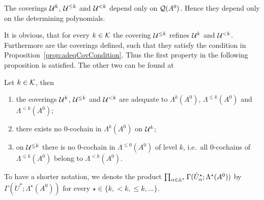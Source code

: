 \begin{rem}
  The coverings $\mathcal{U}^{k}$, $\mathcal{U}^{\leq k}$ and $\mathcal{U}^{<k}$ depend only on
  $\mathcal{Q}(A^0)$. Hence they depend only on the determining polynomials.
\end{rem}
It is obvious, that for every $k\in\mathcal{K}$ the covering $\mathcal{U}^{\leq k}$ refines
$\mathcal{U}^{k}$ and $\mathcal{U}^{<k}$.
Furthermore are the coverings defined, such that they satisfy the
condition in Proposition~\ref{prop:adeqCovCondition}.
Thus the first property in the following proposition is satisfied. The other
two can be found at \cite[Prop.II.3.1 (iv)]{Loday1994}
\begin{prop}\label{prop:adequateProperties}
  Let $k\in\mathcal{K}$, then
  \begin{enumerate}
    \item the coverings $\mathcal{U}^{k}$, $\mathcal{U}^{\leq k}$ and $\mathcal{U}^{<k}$ are adequate
      to $\Lambda^k(A^0)$, $\Lambda^{\leq k}(A^0)$ and $\Lambda^{<k}(A^0)$;
    \item there exists no $0$-cochain in $\Lambda^k(A^0)$ on $\mathcal{U}^k$;
    \item on $\mathcal{U}^{\leq k}$ there is no $0$-cochain in $\Lambda^{\leq0}(A^0)$
      of level $k$, i.e.\ all $0$-cochains of $\Lambda^{\leq k}(A^0)$
      belong to $\Lambda^{<k}(A^0)$.
  \end{enumerate}
\end{prop}
To have a shorter notation, we denote the product
$\prod_{\alpha\in\mathbb{A}^\star}\Gamma(\dot U_\alpha^\star;\Lambda^\star(A^0))$ by
$\Gamma(\dot U^\star;\Lambda^\star(A^0))$ for every
$\star\in\{k,<k,\leq k,\dots\}$.

